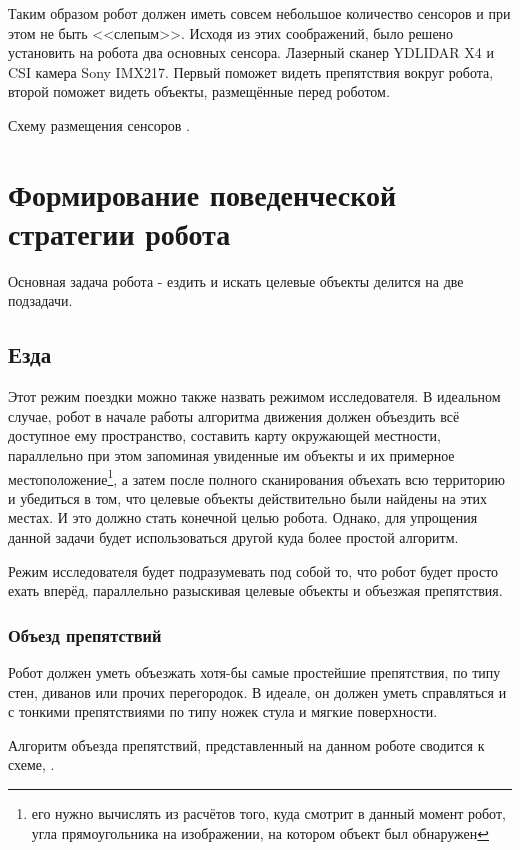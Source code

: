 Таким образом робот должен иметь совсем небольшое количество сенсоров и при этом не быть <<слепым>>. Исходя из этих соображений, было решено установить на робота два основных сенсора. Лазерный сканер YDLIDAR X4 и CSI камера Sony IMX217. Первый поможет видеть препятствия вокруг робота, второй поможет видеть объекты, размещённые перед роботом. 

Схему размещения сенсоров .

\section{Формирование поведенческой стратегии робота}

Основная задача робота - ездить и искать целевые объекты делится на две подзадачи.

\subsection{Езда}

Этот режим поездки можно также назвать режимом исследователя. В идеальном случае, робот в начале работы алгоритма движения должен объездить всё доступное ему пространство, составить карту окружающей местности, параллельно при этом запоминая увиденные им объекты и их примерное местоположение\footnote{его нужно вычислять из расчётов того, куда смотрит в данный момент робот, угла прямоугольника на изображении, на котором объект был обнаружен}, а затем после полного сканирования объехать всю территорию и убедиться в том, что целевые объекты действительно были найдены на этих местах. И это должно стать конечной целью робота. Однако, для упрощения данной задачи будет использоваться другой куда более простой алгоритм. 

Режим исследователя будет подразумевать под собой то, что робот будет просто ехать вперёд, параллельно разыскивая целевые объекты и объезжая препятствия. 

\subsubsection{Объезд препятствий}

Робот должен уметь объезжать хотя-бы самые простейшие препятствия, по типу стен, диванов или прочих перегородок. В идеале, он должен уметь справляться и с тонкими препятствиями по типу ножек стула и мягкие поверхности.

Алгоритм объезда препятствий, представленный на данном роботе сводится к схеме, .


